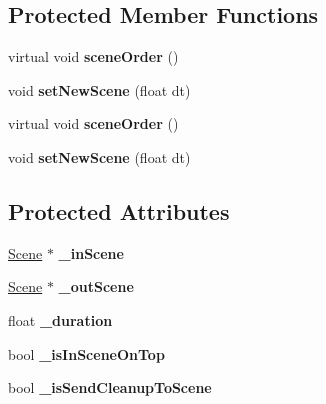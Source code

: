 \subsection*{Protected Member Functions}
\begin{DoxyCompactItemize}
\item 
\mbox{\label{classTransitionScene_a86ce55fb5c0207f3eb6d5bf748568d42}} 
virtual void {\bfseries scene\+Order} ()
\item 
\mbox{\label{classTransitionScene_a49ef7230a8b2ccc154cfa806998d633b}} 
void {\bfseries set\+New\+Scene} (float dt)
\item 
\mbox{\label{classTransitionScene_aa0c4149a2beca965ce2f68cfa440ddda}} 
virtual void {\bfseries scene\+Order} ()
\item 
\mbox{\label{classTransitionScene_a49ef7230a8b2ccc154cfa806998d633b}} 
void {\bfseries set\+New\+Scene} (float dt)
\end{DoxyCompactItemize}
\subsection*{Protected Attributes}
\begin{DoxyCompactItemize}
\item 
\mbox{\label{classTransitionScene_a03a9dad9412cacf564676644b2b0802d}} 
\hyperlink{classScene}{Scene} $\ast$ {\bfseries \+\_\+in\+Scene}
\item 
\mbox{\label{classTransitionScene_a2ecd3f1f1cd0a88e4781eabe99325a03}} 
\hyperlink{classScene}{Scene} $\ast$ {\bfseries \+\_\+out\+Scene}
\item 
\mbox{\label{classTransitionScene_aa0243fae9f627d2314f3ba07705323b5}} 
float {\bfseries \+\_\+duration}
\item 
\mbox{\label{classTransitionScene_afdd51347791a838d7776cea63415ba20}} 
bool {\bfseries \+\_\+is\+In\+Scene\+On\+Top}
\item 
\mbox{\label{classTransitionScene_a94f647d2e26503b78918d55ecaab4602}} 
bool {\bfseries \+\_\+is\+Send\+Cleanup\+To\+Scene}
\end{DoxyCompactItemize}

